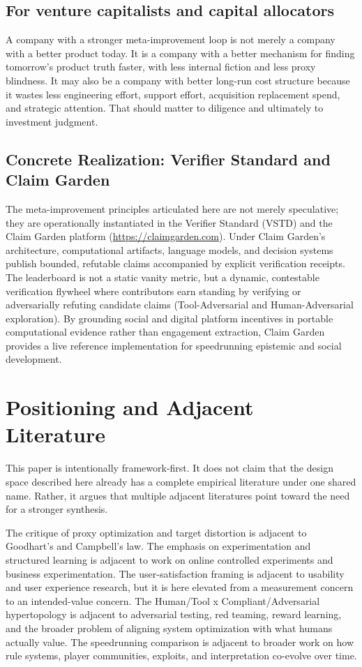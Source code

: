 \documentclass[11pt]{article}
\begin{document}
\subsection{For venture capitalists and capital allocators}

A company with a stronger meta-improvement loop is not merely a company with a better product today. It is a company with a better mechanism for finding tomorrow's product truth faster, with less internal fiction and less proxy blindness. It may also be a company with better long-run cost structure because it wastes less engineering effort, support effort, acquisition replacement spend, and strategic attention. That should matter to diligence and ultimately to investment judgment.

\subsection{Concrete Realization: Verifier Standard and Claim Garden}

The meta-improvement principles articulated here are not merely speculative; they are operationally instantiated in the Verifier Standard (VSTD) and the Claim Garden platform (\url{https://claimgarden.com}). Under Claim Garden's architecture, computational artifacts, language models, and decision systems publish bounded, refutable claims accompanied by explicit verification receipts. The leaderboard is not a static vanity metric, but a dynamic, contestable verification flywheel where contributors earn standing by verifying or adversarially refuting candidate claims (Tool-Adversarial and Human-Adversarial exploration). By grounding social and digital platform incentives in portable computational evidence rather than engagement extraction, Claim Garden provides a live reference implementation for speedrunning epistemic and social development.

\section{Positioning and Adjacent Literature}

This paper is intentionally framework-first. It does not claim that the design space described here already has a complete empirical literature under one shared name. Rather, it argues that multiple adjacent literatures point toward the need for a stronger synthesis.

The critique of proxy optimization and target distortion is adjacent to Goodhart's and Campbell's law. The emphasis on experimentation and structured learning is adjacent to work on online controlled experiments and business experimentation. The user-satisfaction framing is adjacent to usability and user experience research, but it is here elevated from a measurement concern to an intended-value concern. The Human/Tool x Compliant/Adversarial hypertopology is adjacent to adversarial testing, red teaming, reward learning, and the broader problem of aligning system optimization with what humans actually value. The speedrunning comparison is adjacent to broader work on how rule systems, player communities, exploits, and interpretation co-evolve over time.
\end{document}
